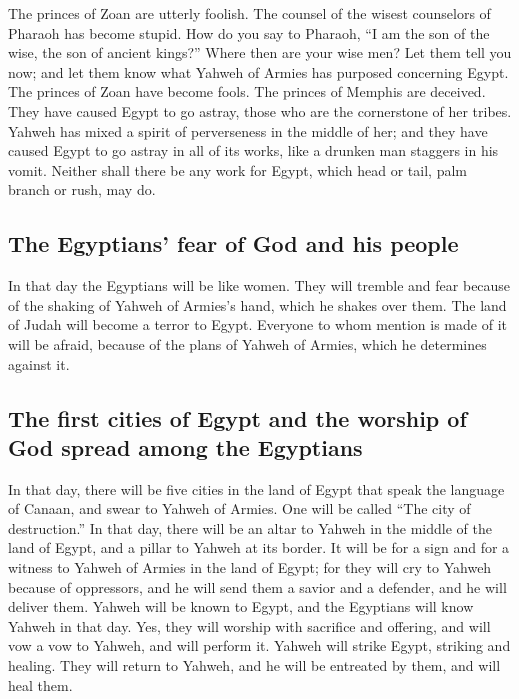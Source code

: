  The princes of Zoan are utterly foolish. The counsel of
the wisest counselors of Pharaoh has become stupid. How do you say to
Pharaoh, ``I am the son of the wise, the son of ancient kings?''
 Where then are your wise men? Let them tell you now; and
let them know what Yahweh of Armies has purposed concerning Egypt.
 The princes of Zoan have become fools. The princes of
Memphis are deceived. They have caused Egypt to go astray, those who are
the cornerstone of her tribes.  Yahweh has mixed a spirit
of perverseness in the middle of her; and they have caused Egypt to go
astray in all of its works, like a drunken man staggers in his vomit.
 Neither shall there be any work for Egypt, which head or
tail, palm branch or rush, may do.

\hypertarget{the-egyptians-fear-of-god-and-his-people}{%
\subsection{The Egyptians' fear of God and his
people}\label{the-egyptians-fear-of-god-and-his-people}}

 In that day the Egyptians will be like women. They will
tremble and fear because of the shaking of Yahweh of Armies's hand,
which he shakes over them.  The land of Judah will become
a terror to Egypt. Everyone to whom mention is made of it will be
afraid, because of the plans of Yahweh of Armies, which he determines
against it.

\hypertarget{the-first-cities-of-egypt-and-the-worship-of-god-spread-among-the-egyptians}{%
\subsection{The first cities of Egypt and the worship of God spread
among the
Egyptians}\label{the-first-cities-of-egypt-and-the-worship-of-god-spread-among-the-egyptians}}

 In that day, there will be five cities in the land of
Egypt that speak the language of Canaan, and swear to Yahweh of Armies.
One will be called ``The city of destruction.''  In that
day, there will be an altar to Yahweh in the middle of the land of
Egypt, and a pillar to Yahweh at its border.  It will be
for a sign and for a witness to Yahweh of Armies in the land of Egypt;
for they will cry to Yahweh because of oppressors, and he will send them
a savior and a defender, and he will deliver them. 
Yahweh will be known to Egypt, and the Egyptians will know Yahweh in
that day. Yes, they will worship with sacrifice and offering, and will
vow a vow to Yahweh, and will perform it.  Yahweh will
strike Egypt, striking and healing. They will return to Yahweh, and he
will be entreated by them, and will heal them.

